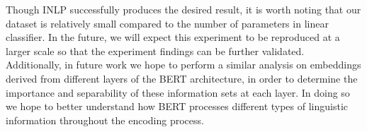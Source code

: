 \documentclass[11pt,a4paper]{article}
\begin{document}
Though INLP successfully produces the desired result, it is worth noting that our dataset is relatively small compared to the number of parameters in linear classifier. In the future, we will expect this experiment to be reproduced at a larger scale so that the experiment findings can be further validated. Additionally, in future work we hope to perform a similar analysis on embeddings derived from different layers of the BERT architecture, in order to determine the importance and separability of these information sets at each layer. In doing so we hope to better understand how BERT processes different types of linguistic information throughout the encoding process.


















\end{document}
